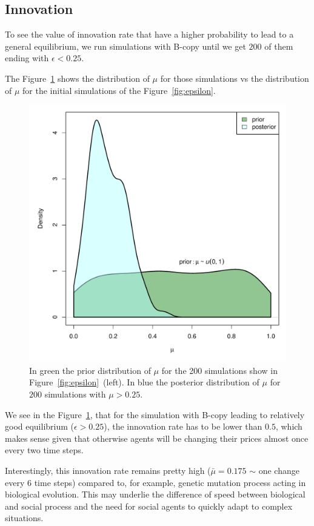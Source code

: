 \documentclass[a1paper,fontscale=.49]{baposter}
\begin{document}
\begin{poster}
{	\vspace{-.3cm}
    \subsection*{Innovation}
		\vspace{-.1cm}
    To see the value of innovation rate that have a higher probability to lead to a general equilibrium, we run simulations with B-copy until we get $200$ of them ending with $\epsilon < 0.25$.

    The Figure~\ref{fig:abc} shows the distribution of $\mu$ for those simulations vs the distribution of $\mu$ for the initial simulations of the Figure~\ref{fig:epsilon}.

\begin{figure}[H]
	\centering
		\includegraphics[width=.5\textwidth]{img/ABC.pdf} 
		\vspace{-.5cm}
		\caption{\small In green the prior distribution of $\mu$ for the 200 simulations show in Figure~\ref{fig:epsilon}~(left). In blue the posterior distribution of $\mu$ for $200$ simulations with $\mu>0.25$. }
		\label{fig:abc}
\end{figure}

We see in the Figure~\ref{fig:abc}, that for the simulation with B-copy leading to relatively good equilibrium ($\epsilon > 0.25$), the innovation rate has to be lower than $0.5$, which makes sense given that otherwise agents will be changing their prices almost once every two time steps. 

Interestingly, this innovation rate remains pretty high ($\bar{\mu} = 0.175$ $\sim$ one change every 6 time steps) compared to, for example, genetic mutation process acting in biological evolution. This may underlie the difference of speed between biological and social process and the need for  social agents to quickly adapt to complex situations. 

}
\end{poster}
\end{document}
